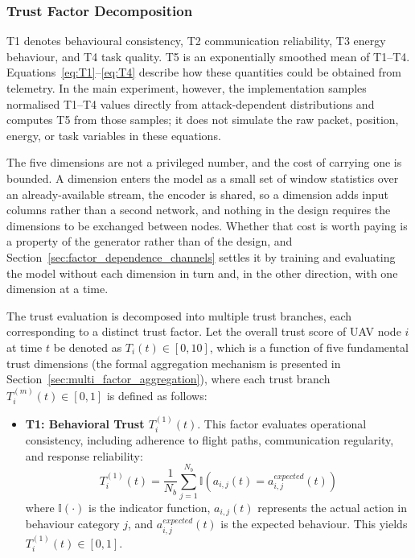 \documentclass[notspecified,article,submit,moreauthors]{Definitions/mdpi}
\begin{document}
\subsubsection{Trust Factor Decomposition}
T1 denotes behavioural consistency, T2 communication reliability, T3 energy behaviour, and T4 task quality. T5 is an exponentially smoothed mean of T1--T4. Equations~\ref{eq:T1}--\ref{eq:T4} describe how these quantities could be obtained from telemetry. In the main experiment, however, the implementation samples normalised T1--T4 values directly from attack-dependent distributions and computes T5 from those samples; it does not simulate the raw packet, position, energy, or task variables in these equations.

The five dimensions are not a privileged number, and the cost of carrying one is bounded. A dimension enters the model as a small set of window statistics over an already-available stream, the encoder is shared, so a dimension adds input columns rather than a second network, and nothing in the design requires the dimensions to be exchanged between nodes. Whether that cost is worth paying is a property of the generator rather than of the design, and Section~\ref{sec:factor_dependence_channels} settles it by training and evaluating the model without each dimension in turn and, in the other direction, with one dimension at a time.

The trust evaluation is decomposed into multiple trust branches, each corresponding to a distinct trust factor. Let the overall trust score of UAV node $i$ at time $t$ be denoted as $T_i(t) \in [0, 10]$, which is a function of five fundamental trust dimensions (the formal aggregation mechanism is presented in Section~\ref{sec:multi_factor_aggregation}),
where each trust branch $T_i^{(m)}(t) \in [0, 1]$ is defined as follows:

\begin{itemize}
    \item \textbf{T1: Behavioral Trust $T_i^{(1)}(t)$}. This factor evaluates operational consistency, including adherence to flight paths, communication regularity, and response reliability:
    \begin{equation}\label{eq:T1}
    T_i^{(1)}(t) = \frac{1}{N_b} \sum_{j=1}^{N_b} \mathbb{I}\!\left(a_{i,j}(t) = a_{i,j}^{expected}(t)\right)
    \end{equation}
    where $\mathbb{I}(\cdot)$ is the indicator function, $a_{i,j}(t)$ represents the actual action in behaviour category $j$, and $a_{i,j}^{expected}(t)$ is the expected behaviour. This yields $T_i^{(1)}(t) \in [0, 1]$.
\end{itemize}
\end{document}

